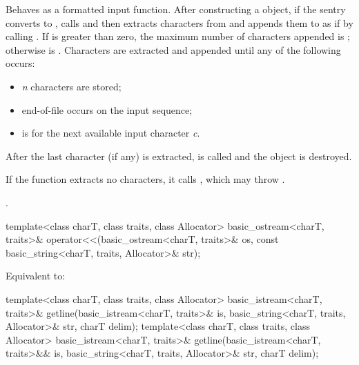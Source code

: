\begin{itemdescr}
\pnum
\effects
Behaves as a formatted input function.
After constructing a
object, if the sentry converts to , calls
and then extracts characters from  and appends them
to  as if by calling
.
If
is greater than zero, the maximum
number  of characters appended is
;
otherwise  is
.
Characters are extracted and appended until any of the following
occurs:
\begin{itemize}
\item
\textit{n}
characters are stored;
\item
end-of-file occurs on the input sequence;
\item
{}
is  for the next available input character
\textit{c}.
\end{itemize}

\pnum
After the last character (if any) is extracted,
is called and the
object is destroyed.

\pnum
If the function extracts no characters, it calls
,
which may throw
.

\pnum
\returns
{}.
\end{itemdescr}

%
\begin{itemdecl}
template<class charT, class traits, class Allocator>
  basic_ostream<charT, traits>&
    operator<<(basic_ostream<charT, traits>& os,
               const basic_string<charT, traits, Allocator>& str);
\end{itemdecl}

\begin{itemdescr}
\pnum
\effects
Equivalent to: 
\end{itemdescr}

%
\begin{itemdecl}
template<class charT, class traits, class Allocator>
  basic_istream<charT, traits>&
    getline(basic_istream<charT, traits>& is,
            basic_string<charT, traits, Allocator>& str,
            charT delim);
template<class charT, class traits, class Allocator>
  basic_istream<charT, traits>&
    getline(basic_istream<charT, traits>&& is,
            basic_string<charT, traits, Allocator>& str,
            charT delim);
\end{itemdecl}

